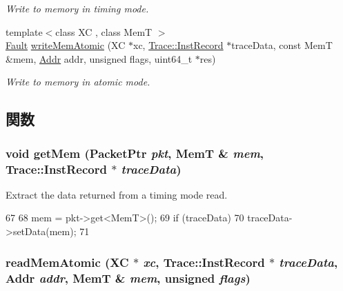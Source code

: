 \begin{DoxyCompactItemize}
\begin{DoxyCompactList}\small\item\em Write to memory in timing mode. \item\end{DoxyCompactList}\item 
{\footnotesize template$<$class XC , class MemT $>$ }\\\hyperlink{classRefCountingPtr}{Fault} \hyperlink{generic_2memhelpers_8hh_a806e635999838018e8f1e2b84e9cb827}{writeMemAtomic} (XC $\ast$xc, \hyperlink{classTrace_1_1InstRecord}{Trace::InstRecord} $\ast$traceData, const MemT \&mem, \hyperlink{base_2types_8hh_af1bb03d6a4ee096394a6749f0a169232}{Addr} addr, unsigned flags, uint64\_\-t $\ast$res)
\begin{DoxyCompactList}\small\item\em Write to memory in atomic mode. \item\end{DoxyCompactList}\end{DoxyCompactItemize}


\subsection{関数}
\hypertarget{generic_2memhelpers_8hh_abed30c0ee19ac7b23d3e6bcf0c86de6f}{
\subsubsection[{getMem}]{\setlength{\rightskip}{0pt plus 5cm}void getMem ({\bf PacketPtr} {\em pkt}, \/  MemT \& {\em mem}, \/  {\bf Trace::InstRecord} $\ast$ {\em traceData})}}
\label{generic_2memhelpers_8hh_abed30c0ee19ac7b23d3e6bcf0c86de6f}


Extract the data returned from a timing mode read. 


\begin{DoxyCode}
67 {
68     mem = pkt->get<MemT>();
69     if (traceData)
70         traceData->setData(mem);
71 }
\end{DoxyCode}
\hypertarget{generic_2memhelpers_8hh_a6793e28c3f96586257658fd5c41a7074}{
\subsubsection[{readMemAtomic}]{ readMemAtomic (XC $\ast$ {\em xc}, \/  {\bf Trace::InstRecord} $\ast$ {\em traceData}, \/  {\bf Addr} {\em addr}, \/  MemT \& {\em mem}, \/  unsigned {\em flags})}}
\label{generic_2memhelpers_8hh_a6793e28c3f96586257658fd5c41a7074}


